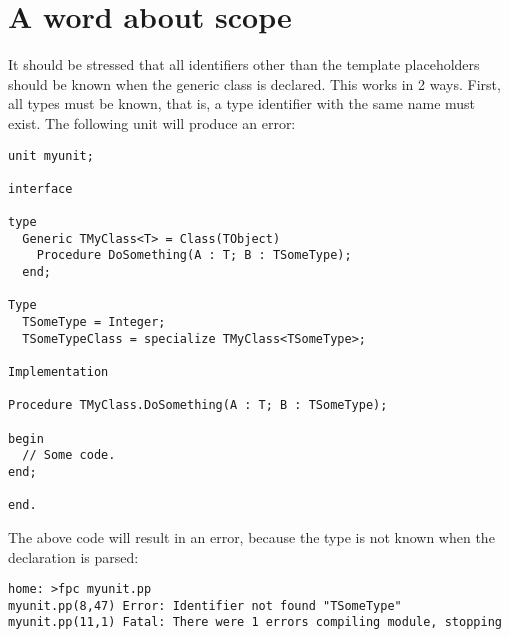 \section{A word about scope}
It should be stressed that all identifiers other than the template placeholders
should be known when the generic class is declared. This works in 2 ways.
First, all types must be known, that is, a type identifier with the same name
must exist. The following unit will produce an error:
\begin{verbatim}
unit myunit;

interface

type 
  Generic TMyClass<T> = Class(TObject)
    Procedure DoSomething(A : T; B : TSomeType);
  end;

Type
  TSomeType = Integer;
  TSomeTypeClass = specialize TMyClass<TSomeType>;

Implementation

Procedure TMyClass.DoSomething(A : T; B : TSomeType);

begin
  // Some code.
end;

end.
\end{verbatim}
The above code will result in an error, because the type  is
not known when the declaration is parsed:
\begin{verbatim}
home: >fpc myunit.pp
myunit.pp(8,47) Error: Identifier not found "TSomeType"
myunit.pp(11,1) Fatal: There were 1 errors compiling module, stopping
\end{verbatim}

